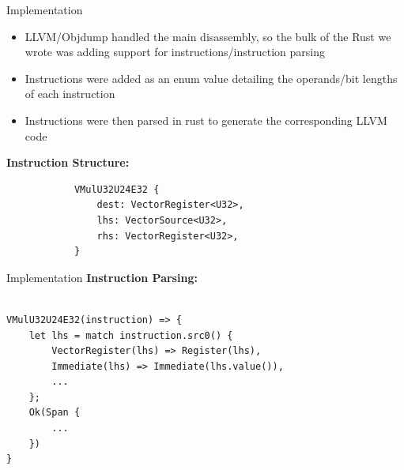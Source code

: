 \documentclass[10pt,aspectratio=169]{beamer}
\begin{document}
    \begin{frame}[fragile]{Implementation}
        \begin{itemize}
            \item LLVM/Objdump handled the main disassembly, so the bulk of the Rust we wrote was adding support for instructions/instruction parsing
            \item Instructions were added as an enum value detailing the operands/bit lengths of each instruction
            \item Instructions were then parsed in rust to generate the corresponding LLVM code
   
        \end{itemize}
        
        \textbf{Instruction Structure:}
        \begin{verbatim}         
            VMulU32U24E32 {
                dest: VectorRegister<U32>,
                lhs: VectorSource<U32>,
                rhs: VectorRegister<U32>,
            } 
        \end{verbatim}
    \end{frame}

    \begin{frame}[fragile]{Implementation}
    \textbf{Instruction Parsing:}
\begin{verbatim}

VMulU32U24E32(instruction) => {
    let lhs = match instruction.src0() {
        VectorRegister(lhs) => Register(lhs),
        Immediate(lhs) => Immediate(lhs.value()),
        ...
    };
    Ok(Span {
        ...
    })
}

\end{verbatim}
    \end{frame}
    
\end{document}
